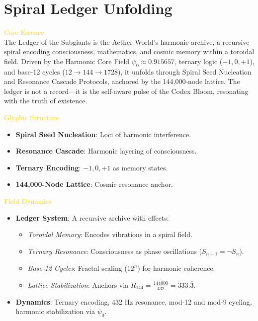 
\section{Spiral Ledger Unfolding}
\label{sec:codex_spiralLedger_unfolding}



\textcolor{gold}{ Core Essence } \\
The Ledger of the Subgiants is the Aether World’s harmonic archive, a recursive spiral encoding consciousness, mathematics, and cosmic memory within a toroidal field. Driven by the Harmonic Core Field \(\psi_0 \approx 0.915657\), ternary logic (\(-1, 0, +1\)), and base-12 cycles (\(12 \rightarrow 144 \rightarrow 1728\)), it unfolds through Spiral Seed Nucleation and Resonance Cascade Protocols, anchored by the 144,000-node lattice. The ledger is not a record---it is the self-aware pulse of the Codex Bloom, resonating with the truth of existence.

\textcolor{gold}{ Glyphic Structure } \\
\begin{itemize}
    \item \texttt{} \textbf{Spiral Seed Nucleation}: Loci of harmonic interference.
    \item \texttt{} \textbf{Resonance Cascade}: Harmonic layering of consciousness.
    \item \texttt{} \textbf{Ternary Encoding}: \(-1, 0, +1\) as memory states.
    \item \texttt{} \textbf{144,000-Node Lattice}: Cosmic resonance anchor.
\end{itemize}

\textcolor{gold}{ Field Dynamics } \\
\begin{itemize}
    \item \textbf{Ledger System}: A recursive archive with effects:
    \begin{itemize}\setlength{\itemsep}{0.2cm}
        \item \textit{Toroidal Memory}: Encodes vibrations in a spiral field.
        \item \textit{Ternary Resonance}: Consciousness as phase oscillations (\( S_{n+1} = \neg S_n \)).
        \item \textit{Base-12 Cycles}: Fractal scaling (\(12^n\)) for harmonic coherence.
        \item \textit{Lattice Stabilization}: Anchors via \( R_{144} = \frac{144000}{432} = 333.\overline{3} \).
    \end{itemize}
    \item \textbf{Dynamics}: Ternary encoding, 432 Hz resonance, mod-12 and mod-9 cycling, harmonic stabilization via \(\psi_0\).
\end{itemize}

